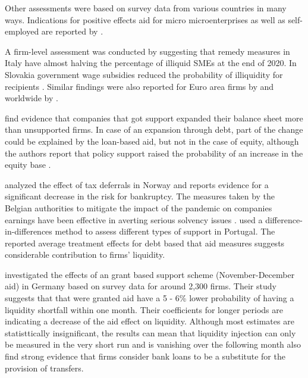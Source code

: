 Other assessments were based on survey data from various countries in many ways. Indications for positive effects aid for micro microenterprises as well as self-employed are reported by \parencite{kochaniak_effectiveness_2023,bertschek_german_2022}.

A firm-level assessment was conducted by \parencite{bellucci_consequences_2022} suggesting that remedy measures in Italy have almost halving the percentage of illiquid SMEs at the end of 2020. 
In Slovakia government wage subsidies reduced the probability of illiquidity for recipients \parencite{lalinsky_distribution_2021}.
Similar findings were also reported for Euro area firms by \parencite{de_santis_impact_2021} and worldwide by \parencite{igan_shot_2023}.

\parencite{harasztosi_firm-level_2022} find evidence that companies that got support expanded their balance sheet more than unsupported firms. In case of an expansion through debt, part of the change could be explained by the loan-based aid, but not in the case of equity, although the authors report that policy support raised the probability of an increase in the equity base \parencite{harasztosi_firm-level_2022}.

\parencite{stien_covid-19_2022} analyzed the effect of tax deferrals in Norway and reports evidence for a significant decrease in the risk for bankruptcy.
The measures taken by the Belgian authorities to mitigate the impact of the pandemic on companies earnings have been effective in averting serious solvency issues \parencite{piette_how_2022}.
\parencite{costa_state-aids_2021} used a difference-in-differences method to assess different types of support in Portugal. The reported average treatment effects for debt based that aid measures suggests considerable contribution to firms’ liquidity.

\parencite{marek_impact_2022} investigated the effects of an grant based support scheme (November-December aid) in Germany based on survey data for around 2,300 firms. Their study suggests that that were granted aid have a 5 - 6\% lower probability of having a liquidity shortfall within one month. Their coefficients for longer periods are indicating a decrease of the aid effect on liquidity. Although most estimates are statisttically insignificant, the results can mean that liquidity injection can only be measured in the very short run and is vanishing over the following month \parencite{marek_impact_2022} also find strong evidence that firms consider bank loans to be a substitute for the provision of transfers.

